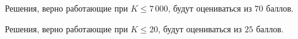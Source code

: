 Решения, верно работающие при $K \le 7\,000$, будут оцениваться из $70$
баллов.

Решения, верно работающие при $K \le 20$, будут оцениваться из $25$
баллов.
